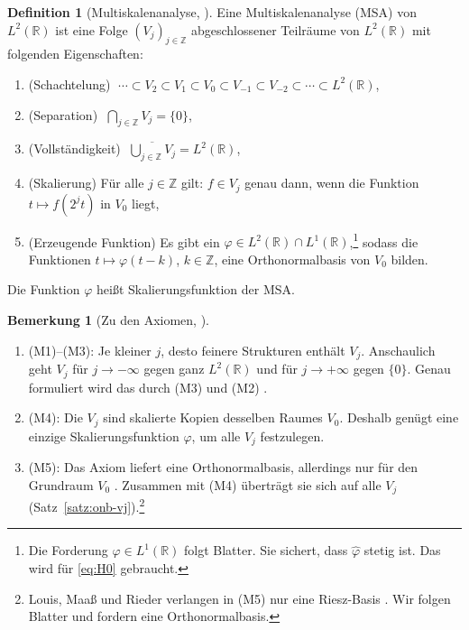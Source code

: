 \documentclass[a4paper,11pt,bibliography=totoc,listof=totoc,headinclude=true,cleardoublepage=empty,oneside]{scrbook}
\theoremstyle{plain}
\theoremstyle{definition}
\newtheorem{Definition}[Satz]{Definition}
\newtheorem{Bemerkung}[Satz]{Bemerkung}
\newcommand{\R}{\mathbb{R}}
\newcommand{\Z}{\mathbb{Z}}
\newcommand{\LZwei}{L^2(\R)}
\begin{document}
\begin{Definition}[Multiskalenanalyse, {\cite[Kap.~5.1, (a)--(c)]{blatter}}] %
\label{def:msa}
Eine Multiskalenanalyse (MSA) von $\LZwei$ ist eine Folge $(V_j)_{j\in\Z}$
abgeschlossener Teilräume von $\LZwei$ mit folgenden Eigenschaften:
\begin{enumerate}
\item[(M1)] (Schachtelung)
  $\;\cdots \subset V_{2} \subset V_{1} \subset V_{0} \subset V_{-1} \subset V_{-2} \subset \cdots \subset \LZwei$,
\item[(M2)] (Separation)
  $\;\displaystyle\bigcap_{j\in\Z} V_j = \{0\}$,
\item[(M3)] (Vollständigkeit)
  $\;\displaystyle\overline{\bigcup_{j\in\Z} V_j} = \LZwei$,
\item[(M4)] (Skalierung) Für alle $j \in \Z$ gilt: $f \in V_j$ genau dann, wenn
  die Funktion $t \mapsto f(2^{j}t)$ in $V_0$ liegt,
\item[(M5)] (Erzeugende Funktion) Es gibt ein
  $\varphi \in \LZwei \cap L^1(\R)$,\footnote{Die Forderung
  $\varphi \in L^1(\R)$ folgt Blatter. Sie sichert, dass $\hat\varphi$ stetig
  ist. Das wird für \eqref{eq:H0} gebraucht.} sodass die Funktionen
  $t \mapsto \varphi(t - k)$, $k \in \Z$, eine Orthonormalbasis von $V_0$ bilden.
\end{enumerate}
Die Funktion $\varphi$ hei\ss{}t Skalierungsfunktion der MSA.
\end{Definition}

\begin{Bemerkung}[Zu den Axiomen, {\cite[Kap.~5.1]{blatter}}] %
\label{bem:msa-axiome}
\begin{enumerate}
\item[(a)] (M1)--(M3): Je kleiner $j$, desto feinere Strukturen enthält $V_j$.
  Anschaulich geht $V_j$ für $j \to -\infty$ gegen ganz $\LZwei$ und für
  $j \to +\infty$ gegen $\{0\}$. Genau formuliert wird das durch (M3) und (M2) 
  \cite[Bem.~2.2.2]{lmr}. %
\item[(b)] (M4): Die $V_j$ sind skalierte Kopien desselben Raumes $V_0$.
  Deshalb genügt eine einzige Skalierungsfunktion $\varphi$, um alle $V_j$ festzulegen.
\item[(c)] (M5): Das Axiom liefert eine Orthonormalbasis, allerdings nur für
  den Grundraum $V_0$ \cite[Kap.~5.1, (c)]{blatter}. %
  Zusammen mit (M4) überträgt sie sich auf alle $V_j$
  (Satz~\ref{satz:onb-vj}).\footnote{Louis, Maa\ss{} und Rieder verlangen in
  (M5) nur eine Riesz-Basis \cite[Def.~2.2.1]{lmr}. %
  Wir folgen Blatter und fordern eine Orthonormalbasis.}
\end{enumerate}
\end{Bemerkung}
\end{document}
